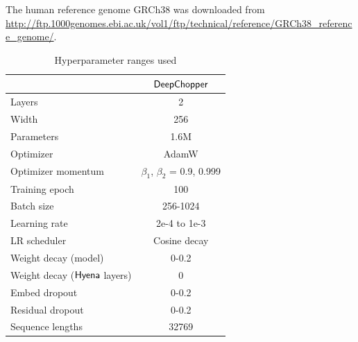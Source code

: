 \documentclass[pdflatex, sn-mathphys-num, lineno]{sn-jnl}%
\newcommand{\chopper}{DeepChopper\xspace}
\theoremstyle{thmstyleone}%
\theoremstyle{thmstyletwo}%
\theoremstyle{thmstylethree}%
\begin{document}
\backmatter



The human reference genome GRCh38 was downloaded from \url{http://ftp.1000genomes.ebi.ac.uk/vol1/ftp/technical/reference/GRCh38\_reference\_genome/}.


\begin{table}
	\small
	\centering
	\caption{Hyperparameter ranges used}
	\vspace{10pt}
	\begin{tabular}{lc}
		\toprule
		                                    & {$\sf \chopper$}                  \\
		\midrule
		Layers                              & 2                                 \\
		Width                               & 256                               \\
		Parameters                          & 1.6M                              \\
		Optimizer                           & AdamW                             \\
		Optimizer momentum                  & $\beta_1$, $\beta_2$ = 0.9, 0.999 \\
		Training epoch                      & 100                               \\
		Batch size                          & 256-1024                          \\
		Learning rate                       & 2e-4 to 1e-3                      \\
		LR scheduler                        & Cosine decay                      \\
		Weight decay (model)                & 0-0.2                             \\
		Weight decay ({$\sf Hyena$} layers) & 0                                 \\
		Embed dropout                       & 0-0.2                             \\
		Residual dropout                    & 0-0.2                             \\
		Sequence lengths                    & 32769                             \\
		\midrule
	\end{tabular}
	\label{tab:nucleotideTRX_hyperparameter}
\end{table}
\end{document}
